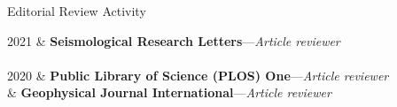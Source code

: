 \begin{rSection}{Editorial Review Activity}
	\begin{timeline}
		2021
			& \textbf{Seismological Research Letters}---\textit{Article reviewer}
			\\
			\\
		2020 
			& \textbf{Public Library of Science (PLOS) One}---\textit{Article reviewer}\\
			& \textbf{Geophysical Journal International}---\textit{Article reviewer}
	\end{timeline}
\end{rSection}